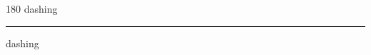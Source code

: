
\begin{frame}
\begin{center}
\begin{turn}{180}
{\fontsize{2.5cm}{1em}\selectfont dashing}
\end{turn}
\vspace{1em}\par  
\hrule
\vspace{1em}\par  
{\fontsize{2.5cm}{1em}\selectfont dashing}
\end{center}
\end{frame}
